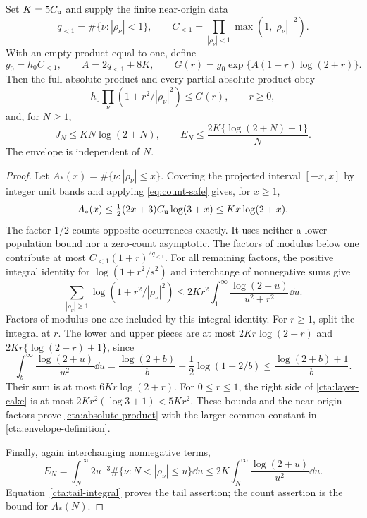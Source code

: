 \begin{lemma}
\label{cta:envelope}
Set $K=5C_{\mathrm u}$ and supply the finite near-origin data
\begin{equation}
 q_{<1}=\#\{\nu:|\rho_\nu|<1\},\qquad
 C_{<1}=\prod_{|\rho_\nu|<1}\max(1,|\rho_\nu|^{-2}).
 \label{cta:near-data}
\end{equation}
With an empty product equal to one, define
\begin{equation}
 g_0=h_0C_{<1},\qquad A=2q_{<1}+8K,\qquad
 G(r)=g_0\exp\{A(1+r)\log(2+r)\}.
 \label{cta:envelope-definition}
\end{equation}
Then the full absolute product and every partial absolute product obey
\begin{equation}
 h_0\prod_\nu(1+r^2/|\rho_\nu|^2)\le G(r),\qquad r\ge0,
 \label{cta:absolute-product}
\end{equation}
and, for $N\ge1$,
\begin{equation}
 J_N\le KN\log(2+N),\qquad
 E_N\le\frac{2K\{\log(2+N)+1\}}N.
 \label{cta:tail-bound}
\end{equation}
The envelope is independent of $N$.
\end{lemma}

\begin{proof}
Let $A_*(x)=\#\{\nu:|\rho_\nu|\le x\}$. Covering the projected
interval $[-x,x]$ by integer unit bands and applying
\eqref{eq:count-safe} gives, for $x\ge1$,
\[
 A_*(x)\le\tfrac12(2x+3)C_{\mathrm u}\log(3+x)
          \le Kx\log(2+x).
\]
The factor $1/2$ counts opposite occurrences exactly. It uses neither a
lower population bound nor a zero-count asymptotic. The factors of
modulus below one contribute at most $C_{<1}(1+r)^{2q_{<1}}$.
For all remaining factors, the positive integral identity for
$\log(1+r^2/s^2)$ and interchange of nonnegative sums give
\begin{equation}
 \sum_{|\rho_\nu|\ge1}\log(1+r^2/|\rho_\nu|^2)
 \le2Kr^2\int_1^\infty\frac{\log(2+u)}{u^2+r^2}\dd u.
 \label{cta:layer-cake}
\end{equation}
Factors of modulus one are included by this integral identity.
For $r\ge1$, split the integral at $r$. The lower and upper pieces
are at most $2Kr\log(2+r)$ and $2Kr\{\log(2+r)+1\}$, since
\begin{equation}
 \int_b^\infty\frac{\log(2+u)}{u^2}\dd u
 =\frac{\log(2+b)}b+\frac12\log(1+2/b)
 \le\frac{\log(2+b)+1}b.
 \label{cta:tail-integral}
\end{equation}
Their sum is at most $6Kr\log(2+r)$. For $0\le r\le1$, the right
side of \eqref{cta:layer-cake} is at most
$2Kr^2(\log3+1)<5Kr^2$. These bounds and the near-origin factors
prove \eqref{cta:absolute-product} with the larger common constant
in \eqref{cta:envelope-definition}.

Finally, again interchanging nonnegative terms,
\[
 E_N=\int_N^\infty2u^{-3}
              \#\{\nu:N<|\rho_\nu|\le u\}\dd u
 \le2K\int_N^\infty\frac{\log(2+u)}{u^2}\dd u.
\]
Equation~\eqref{cta:tail-integral} proves the tail assertion; the
count assertion is the bound for $A_*(N)$.
\end{proof}

